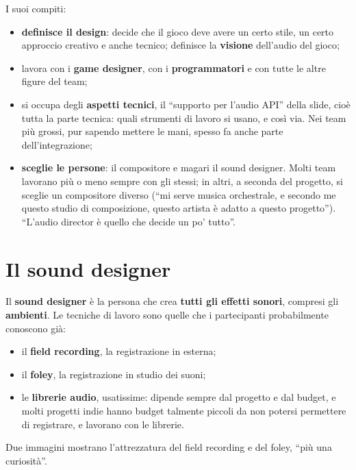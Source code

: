I suoi compiti:
\begin{itemize}
  \item \textbf{definisce il design}: decide che il gioco deve avere un certo
        stile, un certo approccio creativo e anche tecnico; definisce la
        \textbf{visione} dell'audio del gioco;
  \item lavora con i \textbf{game designer}, con i \textbf{programmatori} e con
        tutte le altre figure del team;
  \item si occupa degli \textbf{aspetti tecnici}, il ``supporto per l'audio
        API'' della slide, cioè tutta la parte tecnica: quali strumenti di lavoro
        si usano, e così via. Nei team più grossi, pur sapendo mettere le mani,
        spesso fa anche parte dell'integrazione;
  \item \textbf{sceglie le persone}: il compositore e magari il sound designer.
        Molti team lavorano più o meno sempre con gli stessi; in altri, a seconda
        del progetto, si sceglie un compositore diverso (``mi serve musica
        orchestrale, e secondo me questo studio di composizione, questo artista
        è adatto a questo progetto''). ``L'audio director è quello che decide un
        po' tutto''.
\end{itemize}

\section{Il sound designer}
\label{z9:sec:sounddesigner}

Il \textbf{sound designer} è la persona che crea \textbf{tutti gli effetti
sonori}, compresi gli \textbf{ambienti}. Le tecniche di lavoro sono quelle che i
partecipanti probabilmente conoscono già:
\begin{itemize}
  \item il \textbf{field recording}, la registrazione in esterna;
  \item il \textbf{foley}, la registrazione in studio dei suoni;
  \item le \textbf{librerie audio}, usatissime: dipende sempre dal progetto e
        dal budget, e molti progetti indie hanno budget talmente piccoli da non
        potersi permettere di registrare, e lavorano con le librerie.
\end{itemize}
Due immagini mostrano l'attrezzatura del field recording e del foley, ``più una
curiosità''.

